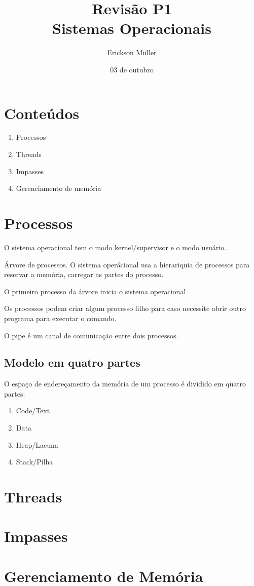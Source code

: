 \documentclass[ ]{article}
\title{Revisão P1\\Sistemas Operacionais}
\author{Erickson Müller}
\date{03 de outubro}
\begin{document}
	\maketitle
	\section*{Conteúdos}
		\begin{enumerate}
			\item Processos
			\item Threads
			\item Impasses
			\item Gerenciamento de memória
		\end{enumerate}
	\newpage
	\section{Processos}
	
		O sistema operacional tem o modo kernel/supervisor e o modo usuário.
		
		Árvore de processos. O sistema operácional usa a hierariquia de processos para reservar a memória, carregar as partes do processo.
		
		O primeiro processo da árvore inicia o sistema operacional
		
		Os processos podem criar algum processo filho para caso necessite abrir outro programa para executar o comando.
		
		O pipe é um canal de comunicação entre dois processos.
		
		\subsection{Modelo em quatro partes}
		O espaço de endereçamento da memória de um processo é dividido em quatro partes:
			\begin{enumerate}
				\item Code/Text
				\item Data
				\item Heap/Lacuna
				\item Stack/Pilha
			\end{enumerate}
	\section{Threads}
	\section{Impasses}
	\section{Gerenciamento de Memória}
\end{document}
